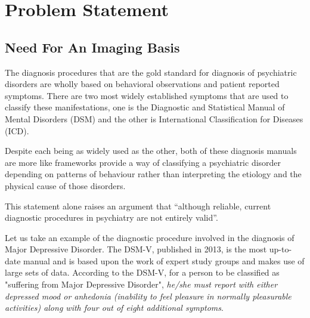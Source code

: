 \documentclass{article}
\begin{document}

\newpage

\section{Problem Statement}

\subsection{Need For An Imaging Basis}

The diagnosis procedures that are the gold standard for diagnosis of
psychiatric disorders are wholly based on behavioral observations and
patient reported symptoms. There are two most widely established
symptoms that are used to classify these manifestations, one is the
Diagnostic and Statistical Manual of Mental Disorders (DSM) and the
other is International Classification for Diseases (ICD).

Despite each being as widely used as the other, both of these
diagnosis manuals are more like frameworks provide a way of
classifying a psychiatric disorder depending on patterns of behaviour
rather than interpreting the etiology and the physical cause of those
disorders.

This statement alone raises an argument that ``although reliable,
current diagnostic procedures in psychiatry are not entirely valid''.

\iffalse
Reliable in the sense that any trained professional will arrive at
the same diagnosis for each patient.

Valid in the sense that it reflects the underlying psychological
and biological commonalities and differences among different
disorders to a certain extent. Validity continues to be more
difficult to achieve.
\fi

Let us take an example of the diagnostic procedure involved in the
diagnosis of Major Depressive Disorder. The DSM-V, published in 2013,
is the most up-to-date manual and is based upon the work of expert
study groups and makes use of large sets of data. According to the
DSM-V, for a person to be classified as "suffering from Major
Depressive Disorder", \textit{he/she must report with either depressed
mood or anhedonia (inability to feel pleasure in normally pleasurable
activities) along with four out of eight additional symptoms}.
\end{document}
